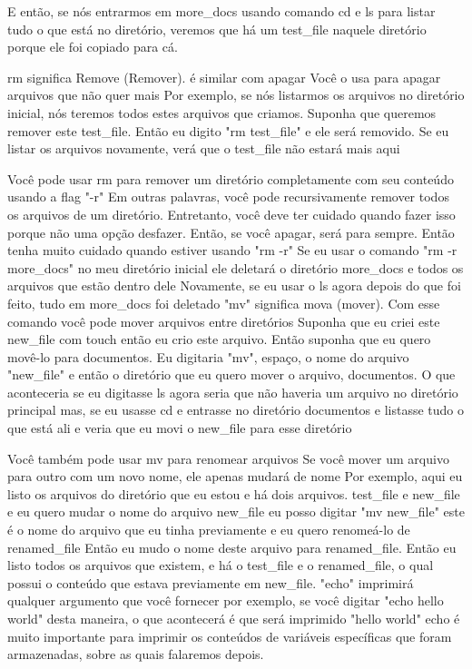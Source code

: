 E então, se nós entrarmos em more\_docs usando comando cd e ls para listar tudo o que está no diretório, veremos que há um test\_file naquele diretório porque ele foi copiado para cá.

rm significa Remove (Remover). é similar com apagar Você o usa para apagar arquivos que não quer mais Por exemplo, se nós listarmos os arquivos no diretório inicial, nós teremos todos estes arquivos que criamos. Suponha que queremos remover este test\_file. Então eu digito "rm test\_file" e ele será removido. Se eu listar os arquivos novamente, verá que o test\_file não estará mais aqui 

Você pode usar rm para remover um diretório completamente com seu conteúdo usando a flag "-r" Em outras palavras, você pode recursivamente remover todos os arquivos de um diretório. Entretanto, você deve ter cuidado quando fazer isso porque não uma opção desfazer. Então, se você apagar, será para sempre. Então tenha muito cuidado quando estiver usando "rm -r" Se eu usar o comando "rm -r more\_docs" no meu diretório inicial ele deletará o diretório more\_docs e todos os arquivos que estão dentro dele Novamente, se eu usar o ls agora depois do que foi feito, tudo em more\_docs foi deletado "mv" significa mova (mover). Com esse comando você pode mover arquivos entre diretórios Suponha que eu criei este new\_file com touch então eu crio este arquivo. Então suponha que eu quero movê-lo  para documentos. Eu digitaria "mv", espaço, o nome do arquivo "new\_file" e então o diretório que eu quero mover o arquivo, documentos. O que aconteceria se eu digitasse ls agora seria que não haveria um arquivo no diretório principal mas, se eu usasse cd e entrasse no diretório documentos e listasse tudo o que está ali e veria que eu movi o new\_file para esse diretório 

Você também pode usar mv para renomear arquivos Se você mover um arquivo para outro com um novo nome, ele apenas mudará de nome Por exemplo, aqui eu listo os arquivos do diretório que eu estou e há dois arquivos. test\_file e new\_file e eu quero mudar o nome do arquivo new\_file eu posso digitar "mv new\_file" este é o nome do arquivo que eu tinha previamente e eu quero renomeá-lo de renamed\_file Então eu mudo o nome deste arquivo para renamed\_file. Então eu listo todos os arquivos que existem, e há o test\_file e o renamed\_file, o qual possui o conteúdo que estava previamente em new\_file. "echo" imprimirá qualquer argumento que você fornecer por exemplo, se você digitar "echo hello world" desta maneira, o que acontecerá é que será imprimido "hello world" echo é muito importante para imprimir os conteúdos de variáveis específicas que foram armazenadas, sobre as quais falaremos depois. 

